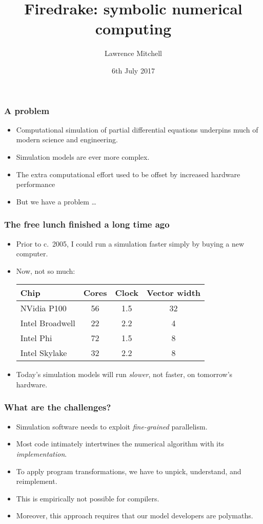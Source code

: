 \documentclass[presentation]{beamer}
\date{6th July 2017}
\author{Lawrence Mitchell\inst{1,*}}
\institute{
\inst{1}Departments of Computing and Mathematics, Imperial College
London

\inst{*}\texttt{lawrence.mitchell@imperial.ac.uk}
}
\title{Firedrake: symbolic numerical computing}
\begin{document}
\maketitle

\begin{frame}
  \frametitle{A problem}
  \begin{itemize}
  \item Computational simulation of partial differential equations
    underpins much of modern science and engineering.
  \item Simulation models are ever more complex.
  \item The extra computational effort used to be offset by increased
    hardware performance
  \item But we have a problem \dots
  \end{itemize}
\end{frame}

\begin{frame}
  \frametitle{The free lunch finished a long time ago}
  \begin{itemize}
  \item Prior to c.~2005, I could run a simulation faster simply by buying a
    new computer.
  \item Now, not so much:

  \begin{tabular}{lccc}
    Chip            & Cores & Clock & Vector width \\
    \hline
    NVidia P100     & 56    & 1.5   & 32           \\
    Intel Broadwell & 22    & 2.2   & 4            \\
    Intel Phi       & 72    & 1.5   & 8            \\
    Intel Skylake   & 32    & 2.2   & 8            \\
  \end{tabular}

\item Today's simulation models will run \emph{slower}, not faster, on
  tomorrow's hardware.
  \end{itemize}
\end{frame}

\begin{frame}
  \frametitle{What are the challenges?}
  \begin{itemize}
  \item Simulation software needs to exploit \emph{fine-grained}
    parallelism.
  \item Most code intimately intertwines the numerical algorithm with
    its \emph{implementation}.
  \item To apply program transformations, we have to unpick,
    understand, and reimplement.
  \item This is empirically not possible for compilers.
  \item Moreover, this approach requires that our model developers are
    polymaths.
  \end{itemize}
\end{frame}
\end{document}
